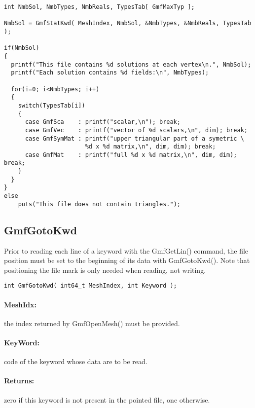 \documentclass[a4paper,12pt]{article}
\begin{document}
\begin{tt}
\begin{verbatim}
int NmbSol, NmbTypes, NmbReals, TypesTab[ GmfMaxTyp ];

NmbSol = GmfStatKwd( MeshIndex, NmbSol, &NmbTypes, &NmbReals, TypesTab );

if(NmbSol)
{
  printf("This file contains %d solutions at each vertex\n.", NmbSol);
  printf("Each solution contains %d fields:\n", NmbTypes);

  for(i=0; i<NmbTypes; i++)
  {
    switch(TypesTab[i])
    {
      case GmfSca    : printf("scalar,\n"); break;
      case GmfVec    : printf("vector of %d scalars,\n", dim); break;
      case GmfSymMat : printf("upper triangular part of a symetric \
                       %d x %d matrix,\n", dim, dim); break;
      case GmfMat    : printf("full %d x %d matrix,\n", dim, dim); break;
    }
  }
}
else
    puts("This file does not contain triangles.");
\end{verbatim}
\end{tt}
\normalfont


\subsection{GmfGotoKwd}
Prior to reading each line of a keyword with the GmfGetLin() command, the file position must be set to the beginning of its data with GmfGotoKwd(). Note that positioning the file mark is only needed when reading, not writing.

\begin{tt}
\begin{verbatim}
int GmfGotoKwd( int64_t MeshIndex, int Keyword );
\end{verbatim}
\end{tt}
\normalfont

\paragraph{MeshIdx:}
the index returned by GmfOpenMesh() must be provided.

\paragraph{KeyWord:} code of the keyword whose data are to be read.

\paragraph{Returns:} zero if this keyword is not present in the pointed file, one otherwise.
\end{document}
